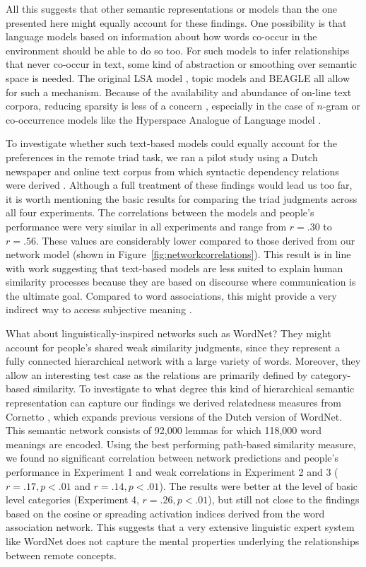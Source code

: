 \documentclass[doc]{apa6}
\begin{document}
All this suggests that other semantic representations or models than the one presented here might equally account for these findings. One possibility is that language models based on information about how words co-occur in the environment should be able to do so too. For such models to infer relationships that never co-occur in text, some kind of abstraction or smoothing over semantic space is needed.  The original LSA model \parencite{Landauer1997}, topic models \parencite{Griffiths2007} and BEAGLE \parencite{Jones2006} all allow for such a mechanism. Because of the availability and abundance of on-line text corpora, reducing sparsity is less of a concern \parencite{Recchia2009}, especially in the case of $n$-gram or co-occurrence models like the Hyperspace Analogue of Language model \parencite{Burgess1998}.

To investigate whether such text-based models could equally account for the preferences in the remote triad task, we ran a pilot study using a Dutch newspaper and online text corpus from which syntactic dependency relations were derived \parencite[see][]{DeDeyne2014CorpusSize}. Although a full treatment of these findings would lead us too far, it is worth mentioning the basic results for comparing the triad judgments across all four experiments. The correlations between the models and people's performance were very similar in all experiments and range from $r = .30$ to $r = .56$. These values are considerably lower compared to those derived from our network model (shown in Figure~\ref{fig:networkcorrelations}). This result is in line with work suggesting that text-based models are less suited to explain human similarity processes because they are based on discourse where communication is the ultimate goal. Compared to word associations, this might provide a very indirect way to access subjective meaning \parencite{Szalay1978,Mollin2009,DeDeyne2014CorpusSize}.

What about linguistically-inspired networks such as WordNet? They might account for people's shared weak similarity judgments, since they represent a fully connected hierarchical network with a large variety of words. Moreover, they allow an interesting test case as the relations are primarily defined by category-based similarity. To investigate to what degree this kind of hierarchical semantic representation can capture our findings we derived relatedness measures from Cornetto \parencite{Vossen2013}, which expands previous versions of the Dutch version of WordNet. This semantic network consists of 92,000 lemmas for which 118,000 word meanings are encoded. Using the best performing path-based similarity measure, we found no significant correlation between network predictions and people's performance in Experiment 1 and weak correlations in Experiment 2 and 3 ($r = .17, p < .01$ and $r = .14, p < .01$). The results were better at the level of basic level categories (Experiment 4, $r = .26, p < .01$), but still not close to the findings based on the cosine or spreading activation indices derived from the word association network. This suggests that a very extensive linguistic expert system like WordNet does not capture the mental properties underlying the relationships between remote concepts.
\end{document}
